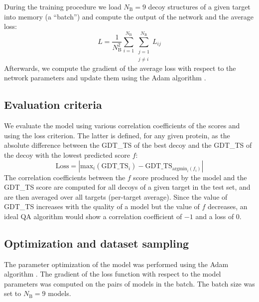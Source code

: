 During the training procedure we load $N_\text{B} = 9$ decoy
structures of a given target into memory (a ``batch'') and compute the
output of the network and the average loss:
$$
L = \frac{1}{N_\text{B}^2} \sum_{i=1}^{N_\text{B}}\sum_{\substack{j=1\\j\neq i}}^{N_\text{B}} L_{ij}
$$
Afterwards, we compute the gradient of the average loss with respect
to the network parameters and update them using the Adam algorithm
\cite{kingma2014adam}.


\subsection{Evaluation criteria}
We evaluate the model using various correlation coefficients of the
scores and using the loss criterion. The latter is defined, for any
given protein, as the absolute difference between the GDT\_TS of the
best decoy and the GDT\_TS of the decoy with the lowest predicted
score $f$:
$$ 
\mathrm{Loss} = \left| \mathrm{max}_i(\text{GDT\_TS}_i) - \text{GDT\_TS}_{\mathrm{argmin}_i(f_i)} \right|
$$
%
The correlation coefficients between the $f$ score produced by the
model and the GDT\_TS score are computed for all decoys of a given
target in the test set, and are then averaged over all targets
(per-target average). Since the value of GDT\_TS increases with the
quality of a model but the value of $f$ decreases, an ideal QA
algorithm would show a correlation coefficient of $-1$ and a loss of
$0$.


\subsection{Optimization and dataset sampling}
The parameter optimization of the model was performed using the Adam
algorithm \cite{kingma2014adam}. The gradient of the loss function
with respect to the model parameters was computed on the pairs of
models in the batch. The batch size was set to $N_\text{B} = 9$
models.

